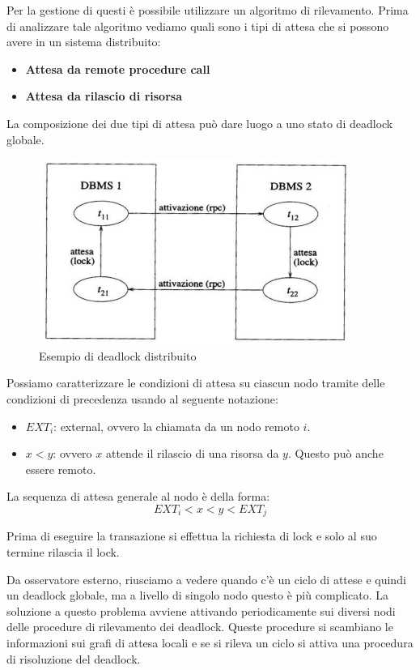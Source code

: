 Per la gestione di questi è possibile utilizzare un algoritmo di rilevamento.
Prima di analizzare tale algoritmo vediamo quali sono i tipi di attesa che
si possono avere in un sistema distribuito:
\begin{itemize}
      \item \textbf{Attesa da remote procedure call}
      \item \textbf{Attesa da rilascio di risorsa}
\end{itemize}
La composizione dei due tipi di attesa può dare luogo a uno stato di deadlock
globale.
\begin{figure}[!ht]
      \centering
      \includegraphics[width=.5\textwidth]{img/DDBMS/deadlock_distribuito.png}
      \caption{Esempio di deadlock distribuito}
      \label{fig:deadlock_distribuito}
\end{figure}

Possiamo caratterizzare le condizioni di attesa su ciascun nodo tramite delle
condizioni di precedenza usando al seguente notazione:
\begin{itemize}
      \item \textbf{$EXT_i$}: external, ovvero la chiamata da un nodo remoto $i$.
      \item $x < y$: ovvero $x$ attende il rilascio di una risorsa da $y$. Questo
            può anche essere remoto.
\end{itemize}
La sequenza di attesa generale al nodo è della forma:
\begin{equation*}
      EXT_i < x < y < EXT_j
\end{equation*}

\begin{nota}
      Prima di eseguire la transazione si effettua la richiesta di lock e solo 
      al suo termine rilascia il lock.
\end{nota}

Da osservatore esterno, riusciamo a vedere quando c'è un ciclo di attese e
quindi un deadlock globale, ma a livello di singolo nodo questo è più complicato.
La soluzione a questo problema avviene attivando periodicamente sui diversi nodi
delle procedure di rilevamento dei deadlock. Queste procedure si scambiano le
informazioni sui grafi di attesa locali e se si rileva un ciclo si attiva una
procedura di risoluzione del deadlock.

